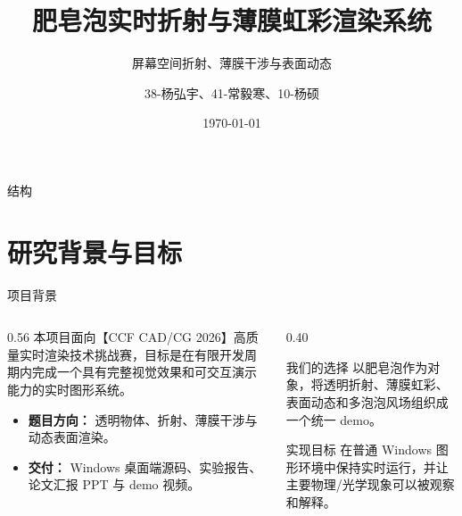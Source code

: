 \documentclass[11pt,aspectratio=169]{beamer}
\title[肥皂泡实时渲染]{肥皂泡实时折射与薄膜虹彩渲染系统}
\subtitle{屏幕空间折射、薄膜干涉与表面动态}
\author[USTCCG26 第3组]{38-杨弘宇、41-常毅寒、10-杨硕}
\institute[USTC]{University of Science and Technology of China}
\date{\today}
\begin{document}
\begin{frame}
  \titlepage
\end{frame}

\begin{frame}{结构}
  \tableofcontents
\end{frame}

\section{研究背景与目标}

\begin{frame}{项目背景}
  \begin{columns}[T]
    \begin{column}{0.56\linewidth}
      本项目面向【CCF CAD/CG 2026】高质量实时渲染技术挑战赛，目标是在有限开发周期内完成一个具有完整视觉效果和可交互演示能力的实时图形系统。
      \vspace{0.6em}
      \begin{itemize}
        \item \textbf{题目方向：} 透明物体、折射、薄膜干涉与动态表面渲染。
        \item \textbf{交付：} Windows 桌面端源码、实验报告、论文汇报 PPT 与 demo 视频。
      \end{itemize}
    \end{column}
    \begin{column}{0.40\linewidth}
      \begin{block}{我们的选择}
        以肥皂泡作为对象，将透明折射、薄膜虹彩、表面动态和多泡泡风场组织成一个统一 demo。
      \end{block}
      \begin{block}{实现目标}
        在普通 Windows 图形环境中保持实时运行，并让主要物理/光学现象可以被观察和解释。
      \end{block}
    \end{column}
  \end{columns}
\end{frame}
\end{document}
